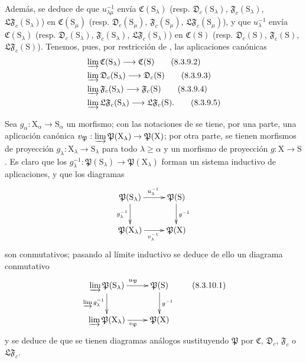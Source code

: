 \begin{env}[8.3.9]
Además, se deduce de  que $u_{\lambda\mu}^{-1}$ envía $\mathfrak{C}(\mathrm{S}_\lambda)$ (resp. $\mathfrak{D}_c(\mathrm{S}_\lambda)$, $\mathfrak{F}_c(\mathrm{S}_\lambda)$, $\mathfrak{LF}_c(\mathrm{S}_\lambda)$) en $\mathfrak{C}(\mathrm{S}_\mu)$ (resp. $\mathfrak{D}_c(\mathrm{S}_\mu)$, $\mathfrak{F}_c(\mathrm{S}_\mu)$, $\mathfrak{LF}_c(\mathrm{S}_\mu)$), y que $u_\lambda^{-1}$ envía $\mathfrak{C}(\mathrm{S}_\lambda)$ (resp. $\mathfrak{D}_c(\mathrm{S}_\lambda)$, $\mathfrak{F}_c(\mathrm{S}_\lambda)$, $\mathfrak{LF}_c(\mathrm{S}_\lambda)$) en $\mathfrak{C}(\mathrm{S})$ (resp. $\mathfrak{D}_c(\mathrm{S})$, $\mathfrak{F}_c(\mathrm{S})$, $\mathfrak{LF}_c(\mathrm{S})$).
Tenemos, pues, por restricción de , las aplicaciones canónicas
\begin{align}
  &\varinjlim\mathfrak{C}(\mathrm{S}_\lambda)\to\mathfrak{C}(\mathrm{S}) \tag{8.3.9.2}\label{IV.8.3.9.2}\\
  &\varinjlim\mathfrak{D}_c(\mathrm{S}_\lambda)\to\mathfrak{D}_c(\mathrm{S}) \tag{8.3.9.3}\label{IV.8.3.9.3}\\
  &\varinjlim\mathfrak{F}_c(\mathrm{S}_\lambda)\to\mathfrak{F}_c(\mathrm{S}) \tag{8.3.9.4}\label{IV.8.3.9.4}\\
  &\varinjlim\mathfrak{LF}_c(\mathrm{S}_\lambda)\to\mathfrak{LF}_c(\mathrm{S}). \tag{8.3.9.5}
\label{IV.8.3.9.5}
\end{align}
\end{env}

\begin{env}[8.3.10]
\label{IV.8.3.10}
Sea $g_\alpha:\mathrm{X}_\alpha\to\mathrm{S}_\alpha$ un morfismo; con las notaciones de  se tiene, por una parte, una aplicación canónica $v_\mathfrak{P}:\varinjlim\mathfrak{P}(\mathrm{X}_\lambda)\to\mathfrak{P}(\mathrm{X})$; por otra parte, se tienen morfismos de proyección $g_\lambda:\mathrm{X}_\lambda\to\mathrm{S}_\lambda$ para todo $\lambda\geqslant\alpha$ y un morfismo de proyección $g:\mathrm{X}\to\mathrm{S}$.
Es claro que los $g_\lambda^{-1}:\mathfrak{P}(\mathrm{S}_\lambda)\to\mathfrak{P}(\mathrm{X}_\lambda)$ forman un sistema inductivo de aplicaciones, y que los diagramas
\[
\xymatrix{
  \mathfrak{P}(\mathrm{S}_\lambda) \ar[r]^{u_\lambda^{-1}} \ar[d]_{g_\lambda^{-1}} & \mathfrak{P}(\mathrm{S}) \ar[d]^{g^{-1}} \\
  \mathfrak{P}(\mathrm{X}_\lambda) \ar[r]_{v_\lambda^{-1}} & \mathfrak{P}(\mathrm{X})
}
\]
son conmutativos; pasando al límite inductivo se deduce de ello un diagrama conmutativo
\begin{equation}
\xymatrix{
  \varinjlim\mathfrak{P}(\mathrm{S}_\lambda) \ar[r]^{u_\mathfrak{P}} \ar[d]_{\varinjlim g_\lambda^{-1}} & \mathfrak{P}(\mathrm{S}) \ar[d]^{g^{-1}} \\
  \varinjlim\mathfrak{P}(\mathrm{X}_\lambda) \ar[r]_{v_\mathfrak{P}} & \mathfrak{P}(\mathrm{X})
}
\tag{8.3.10.1}
\label{IV.8.3.10.1}
\end{equation}
y se deduce de  que se tienen diagramas análogos sustituyendo $\mathfrak{P}$ por $\mathfrak{C}$, $\mathfrak{D}_c$, $\mathfrak{F}_c$ o $\mathfrak{LF}_c$.
\end{env}

